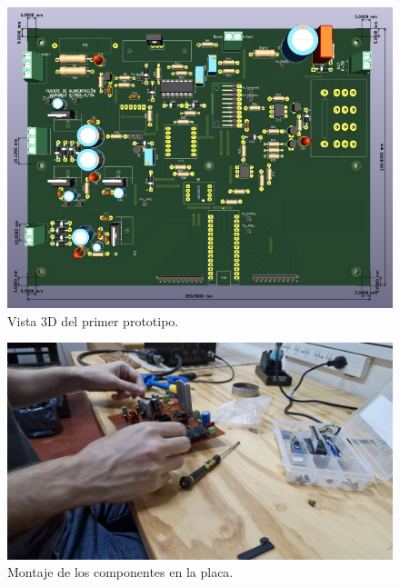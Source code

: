 \begin{figure}[H]
    \centering
    \includegraphics[scale=0.5]{./imagenes/prototipo1.jpg}
    \caption{Vista 3D del primer prototipo.}
    \label{F:PCB_3D}
\end{figure}
\begin{figure}[H]
    \centering
    \includegraphics[scale=0.1]{./imagenes/fotos/montaje.jpg}
    \caption{Montaje de los componentes en la placa.}
    \label{F:montaje_componentes}
\end{figure}

